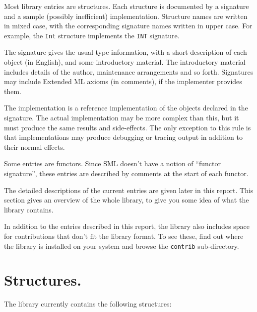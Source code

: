 Most library entries are structures.  Each structure is documented by a
signature and a sample (possibly inefficient) implementation.
Structure names are written in mixed case,
with the corresponding signature names written in upper case.  For
example, the {\tt Int} structure implements the {\tt INT} signature.

The signature gives the usual type information, with a short
description of each object (in English), and some introductory material.
The introductory material includes details of the author, maintenance
arrangements and so forth.  Signatures may include Extended ML axioms
(in comments), if the implementer provides them.

The implementation is a reference implementation of the objects
declared in the signature.  The actual implementation may be more
complex than this, but it must produce the same results and side-effects.
The only exception to this rule is that implementations may produce
debugging or tracing output in addition to their normal effects.

Some entries are functors.  Since SML doesn't have a notion of ``functor
signature'', these entries are described by comments at the start of
each functor.

The detailed descriptions of the current entries are given later in this
report.  This section gives an overview of the whole library, to give
you some idea of what the library contains.

In addition to the entries described in this report, the library also
includes space for contributions that don't fit the library format.
To see these, find out where the library is installed on your system
and browse the {\tt contrib} sub-directory. 



\section{Structures.}

The library currently contains the following structures:

